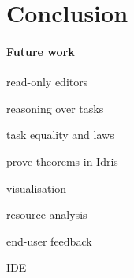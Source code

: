 
\section{Conclusion}

\paragraph{Future work}

\begin{itemize*}
  \item read-only editors
  \item reasoning over tasks
  \item task equality and laws
  \item prove theorems in Idris
  \item visualisation
  \item resource analysis
  \item end-user feedback
  \item IDE
\end{itemize*}
